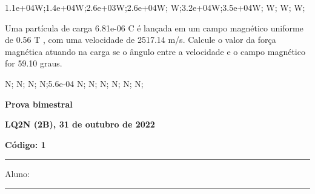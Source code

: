 \documentclass[12pt, addpoints]{exam}
\begin{document}
\begin{questions}
\begin{multicols*}{2}
\begin{oneparchoices}
\choice 1.1e+04W;\choice 1.4e+04W;\choice 2.6e+03W;\choice 2.6e+04W; W;\choice 3.2e+04W;\choice 3.5e+04W; W; W; W;\end{oneparchoices}
\question[20] Uma partícula de carga 6.81e-06 C é lançada em um campo magnético uniforme de    0.56 T , com uma velocidade de 2517.14 m/s. Calcule o valor da força magnética atuando na carga se o ângulo entre a velocidade e o campo magnético for   59.10 graus.

\begin{oneparchoices}
 N; N; N; N;\choice 5.6e-04 N; N; N; N; N; N;\end{oneparchoices}
\end{multicols*}
\end{questions}
\newpage
        \begin{minipage}[b]{0.75\linewidth}
            \begin{flushleft}
                {\bf \large Prova bimestral}
            \end{flushleft}
            \begin{flushleft}
                {\bf \large LQ2N (2B), 31 de outubro de 2022}
            \end{flushleft}
        \end{minipage}
        \begin{minipage}[b]{0.20\linewidth}
            \begin{flushright}
                {\bf \large Código: 1}
            \end{flushright}
        \end{minipage}
        \vspace{0.5cm} \hrule \vspace{0.5cm}
        \begin{minipage}{0.75\linewidth}
            Aluno:
        \end{minipage}
        \vspace{0.5cm} \hrule \vspace{0.5cm}
\end{document}
